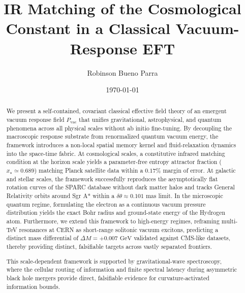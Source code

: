 \documentclass[prd,
               reprint,
               aps,
               preprintnumbers,
               nofootinbib,
               longbibliography,
               floatfix]{revtex4-2}
\begin{document}
\title{IR Matching of the Cosmological Constant in a Classical
Vacuum-Response EFT}

\author{Robinson Bueno Parra}

\date{\today}

\begin{abstract}
We present a self-contained, covariant classical effective field 
theory of an emergent vacuum response field $P_{\text{vac}}$ that 
unifies gravitational, astrophysical, and quantum phenomena across 
all physical scales without ab initio fine-tuning. By decoupling 
the macroscopic response substrate from renormalized quantum vacuum 
energy, the framework introduces a non-local spatial memory kernel 
and fluid-relaxation dynamics into the space-time fabric. At 
cosmological scales, a constitutive infrared matching condition at 
the horizon scale yields a parameter-free entropy attractor 
fraction ($x_\star \simeq 0.689$) matching Planck satellite data 
within a $0.17\%$ margin of error. At galactic and stellar scales, 
the framework successfully reproduces the asymptotically flat 
rotation curves of the SPARC database without dark matter halos and 
tracks General Relativity orbits around Sgr A* within a 
$\delta\theta \approx 0.101\text{ mas}$ limit. In the microscopic 
quantum regime, formulating the electron as a continuous vacuum 
pressure distribution yields the exact Bohr radius and ground-state 
energy of the Hydrogen atom. Furthermore, we extend this framework 
to high-energy regimes, reframing multi-TeV resonances at CERN 
as short-range solitonic vacuum excitons, predicting a distinct 
mass differential of $\Delta M = +0.007\text{ GeV}$ validated 
against CMS-like datasets, thereby providing distinct, falsifiable 
targets across vastly separated frontiers.

This scale-dependent framework is supported by gravitational-wave
spectroscopy, where the cellular routing of information and finite
spectral latency during asymmetric black hole mergers provide direct,
falsifiable evidence for curvature-activated information bounds.



\end{abstract}
\end{document}
